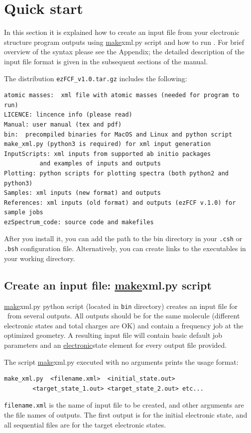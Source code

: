 \documentclass[11pt]{article}
\begin{document}
\section{Quick start}

In this section it is explained how to create an input \xml file from your electronic structure 
program outputs using \ul{make}{xml.py} script and how to run \ezFCF.
For brief overview of the \xml syntax please see the Appendix;
the detailed description of the input file format is given in the  
subsequent sections of the manual. 

The distribution \verb|ezFCF_v1.0.tar.gz| includes the following:
\begin{verbatim}
atomic masses:  xml file with atomic masses (needed for program to run)
LICENCE: lincence info (please read)
Manual: user manual (tex and pdf)
bin:  precompiled binaries for MacOS and Linux and python script
make_xml.py (python3 is required) for xml input generation 
InputScripts: xml inputs from supported ab initio packages
	      and examples of inputs and outputs  
Plotting: python scripts for plotting spectra (both python2 and python3)
Samples: xml inputs (new format) and outputs 
References: xml inputs (old format) and outputs (ezFCF v.1.0) for sample jobs
ezSpectrum_code: source code and makefiles
\end{verbatim}
After you install it, you can add the path to the bin directory in your \verb|.csh| or \verb|.bsh| configuration file.
Alternatively, you can create links to the executables in your working directory.

\subsection{Create an input file: \ul{make}{xml.py} script}
\label{sec:script}

\ul{make}{xml.py} python script (located in {\tt bin} directory)
creates an \xml input file for \ezFCF\ from several \ai outputs. 
All \ai outputs should be for the same molecule (different electronic states and total charges are OK) 
and contain a frequency job at the optimized geometry. 
A resulting \xml input file will contain basic default job parameters and an \ul{electronic}{state} element 
for every output file provided. 

The script \ul{make}{xml.py} executed with no arguments prints the usage format:
\begin{lstlisting}[frame=single,framerule=0pt]
  make_xml.py  <filename.xml>  <initial_state.out>
        <target_state_1.out> <target_state_2.out> etc...
\end{lstlisting}
{\tt filename.xml} is the name of \xml input file to be  created,
and other arguments are the file names of \ai outputs.
The first output is for the initial electronic state,
and all sequential files are for the target electronic states.
\end{document}
